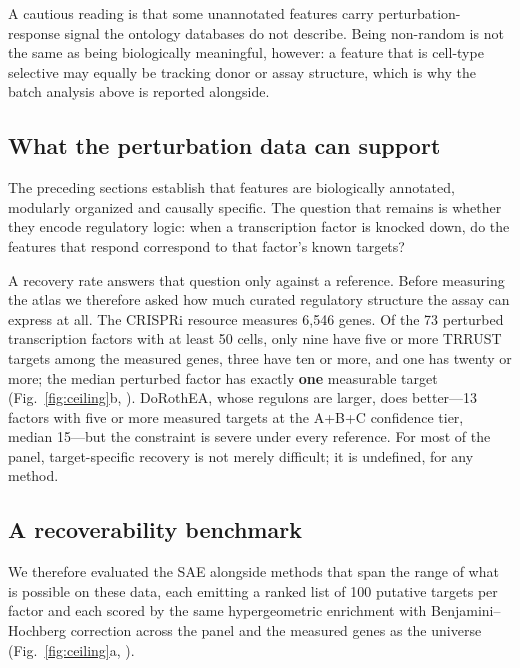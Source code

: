 \documentclass[onecolumn,11pt]{article}
\begin{document}
A cautious reading is that some unannotated features carry perturbation-response signal the
ontology databases do not describe. Being non-random is not the same as being biologically
meaningful, however: a feature that is cell-type selective may equally be tracking donor or assay
structure, which is why the batch analysis above is reported alongside.


\subsection*{What the perturbation data can support}
\label{sec:evaluability}

The preceding sections establish that features are biologically annotated, modularly organized and
causally specific. The question that remains is whether they encode regulatory logic: when a
transcription factor is knocked down, do the features that respond correspond to that factor's
known targets?

A recovery rate answers that question only against a reference. Before measuring the atlas we
therefore asked how much curated regulatory structure the assay can express at all. The CRISPRi
resource measures 6,546 genes. Of the 73 perturbed transcription factors with at least 50 cells,
only nine have five or more TRRUST targets among the measured genes, three have ten or more, and
one has twenty or more; the median perturbed factor has exactly \textbf{one} measurable target
(Fig.~\ref{fig:ceiling}b, ). DoRothEA, whose regulons are larger, does
better---13 factors with five or more measured targets at the A+B+C confidence tier, median 15---but
the constraint is severe under every reference. For most of the panel, target-specific recovery is
not merely difficult; it is undefined, for any method.

\subsection*{A recoverability benchmark}
\label{sec:ceiling}

We therefore evaluated the SAE alongside methods that span the range of what is possible on these
data, each emitting a ranked list of 100 putative targets per factor and each scored by the same
hypergeometric enrichment with Benjamini--Hochberg correction across the panel and the measured
genes as the universe (Fig.~\ref{fig:ceiling}a, ).
\end{document}
